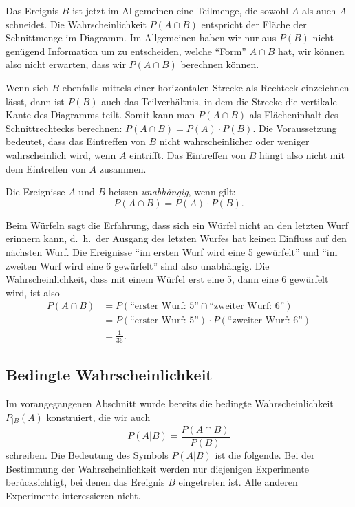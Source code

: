 Das Ereignis $B$ ist jetzt im Allgemeinen eine Teilmenge, die sowohl $A$ 
als auch $\bar A$ schneidet.
Die Wahrscheinlichkeit $P(A \cap B)$ entspricht
der Fläche der Schnittmenge im Diagramm.
Im Allgemeinen haben wir
nur aus $P(B)$ nicht genügend Information um zu entscheiden, welche
``Form'' $A\cap B$ hat, wir können also nicht erwarten, dass wir $P(A\cap B)$
berechnen können.

Wenn sich $B$ ebenfalls mittels einer horizontalen Strecke als Rechteck
einzeichnen lässt, dann ist $P(B)$ auch das Teilverhältnis, in dem
die Strecke die vertikale Kante des Diagramms teilt.
Somit kann man $P(A\cap B)$
als Flächeninhalt des Schnittrechtecks berechnen: $P(A\cap B)=P(A)\cdot P(B)$.
Die Voraussetzung bedeutet, dass das Eintreffen von $B$ nicht wahrscheinlicher
oder weniger
wahrscheinlich wird, wenn $A$ eintrifft.
Das Eintreffen von $B$ hängt also
nicht mit dem Eintreffen von $A$ zusammen.

\begin{definition}
\label{def-unabhaengige-ereignisse}
Die Ereignisse $A$ und $B$ heissen {\em unabhängig}, wenn gilt:
\[
P(A\cap B) = P(A)\cdot P(B).
\]
\end{definition}

Beim Würfeln sagt die Erfahrung, dass sich ein Würfel nicht an den
letzten Wurf erinnern kann, d.~h.~der Ausgang des letzten Wurfes hat
keinen Einfluss auf den nächsten Wurf.
Die Ereignisse ``im ersten
Wurf wird eine 5 gewürfelt'' und ``im zweiten Wurf wird eine 6 gewürfelt''
sind also unabhängig.
Die Wahrscheinlichkeit, dass mit einem Würfel
erst eine 5, dann eine 6 gewürfelt wird, ist also
\begin{align*}
P(A\cap B)&=P(\text{``erster Wurf: 5''}\cap\text{``zweiter Wurf: 6''})\\
&=P(\text{``erster Wurf: 5''})\cdot P(\text{``zweiter Wurf: 6''})\\
&=\frac1{36}.
\end{align*}

\subsection{Bedingte Wahrscheinlichkeit}
Im vorangegangenen Abschnitt wurde bereits die bedingte Wahrscheinlichkeit
$P_{|B}(A)$ konstruiert, die wir auch
\[
P(A|B)=\frac{P(A\cap B)}{P(B)}
\]
schreiben.
Die Bedeutung des Symbols $P(A|B)$ ist die folgende.
Bei der
Bestimmung der Wahrscheinlichkeit werden nur diejenigen Experimente
berücksichtigt, bei denen das Ereignis $B$ eingetreten ist.
Alle anderen Experimente interessieren nicht.

